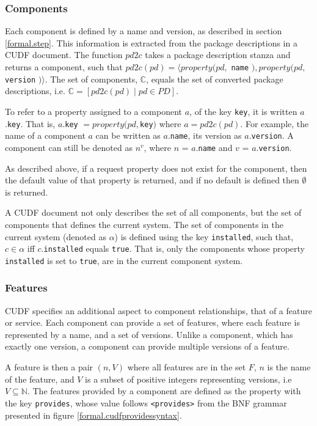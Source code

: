 \subsubsection{Components}
Each component is defined by a name and version, as described in section \ref{formal.step}.
This information is extracted from the package descriptions in a CUDF document.
The function $pd2c$ takes a package description stanza and returns a component, such that $pd2c(pd) = \langle property(pd, $ \verb+name+ $), property(pd, $ \verb+version+ $) \rangle$.
The set of components, $\mathbb{C}$, equals the set of converted package descriptions, i.e. $\mathbb{C} = [ pd2c(pd) \mid pd \in PD]$.

To refer to a property assigned to a component $a$, of the key \verb+key+, it is written $a$.\verb+key+.
That is, $a$.\verb+key+ $= property(pd, $\verb+key+$)$ where $a = pd2c(pd)$.
For example, the name of a component $a$ can be written as $a$.\verb+name+, its version as $a$.\verb+version+.
A component can still be denoted as $n^v$, where $n$ = $a$.\verb+name+ and $v$ = $a$.\verb+version+.

As described above, 
if a request property does not exist for the component, then the default value of that property is returned, and if no default is defined then $\emptyset$ is returned.

A CUDF document not only describes the set of all components, but the set of components that defines the current system.
The set of components in the current system (denoted as $\alpha$) is defined using the key \verb+installed+,
such that, $c \in \alpha$ iff  $c.$\verb+installed+ equals \verb+true+.
That is, only the components whose property \verb+installed+ is set to \verb+true+, are in the current component system.

\subsubsection{Features}
CUDF specifies an additional aspect to component relationships, that of a feature or service.
Each component can provide a set of features, where each feature is represented by a name, and a set of versions.
Unlike a component, which has exactly one version, a component can provide multiple versions of a feature.

A feature is then a pair $(n,V)$ where all features are in the set $F$, $n$ is the name of the feature, and $V$ is a subset of positive integers representing versions, i.e $V \subseteq \mathbb{N}$.
The features provided by a component are defined as the property with the key \verb+provides+, 
whose value follows \verb+<provides>+ from the BNF grammar presented in figure \ref{formal.cudfprovidessyntax}.

